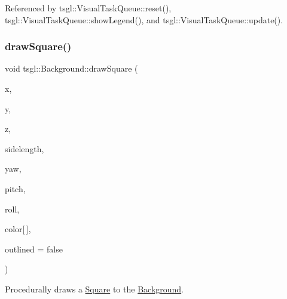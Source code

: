 Referenced by tsgl\+::\+Visual\+Task\+Queue\+::reset(), tsgl\+::\+Visual\+Task\+Queue\+::show\+Legend(), and tsgl\+::\+Visual\+Task\+Queue\+::update().

\mbox{\label{classtsgl_1_1_background_a1eed2db2c90aebeeeeff13b6e9a5b0e2}} 
\subsubsection{\texorpdfstring{draw\+Square()}{drawSquare()}\hspace{0.1cm}{\footnotesize\ttfamily [2/2]}}
{\footnotesize\ttfamily void tsgl\+::\+Background\+::draw\+Square (\begin{DoxyParamCaption}\item[{float}]{x,  }\item[{float}]{y,  }\item[{float}]{z,  }\item[{float}]{sidelength,  }\item[{float}]{yaw,  }\item[{float}]{pitch,  }\item[{float}]{roll,  }\item[{\hyperlink{structtsgl_1_1_color_float}{Color\+Float}}]{color\mbox{[}$\,$\mbox{]},  }\item[{bool}]{outlined = {\ttfamily false} }\end{DoxyParamCaption})\hspace{0.3cm}{\ttfamily [virtual]}}



Procedurally draws a \hyperlink{classtsgl_1_1_square}{Square} to the \hyperlink{classtsgl_1_1_background}{Background}. 

